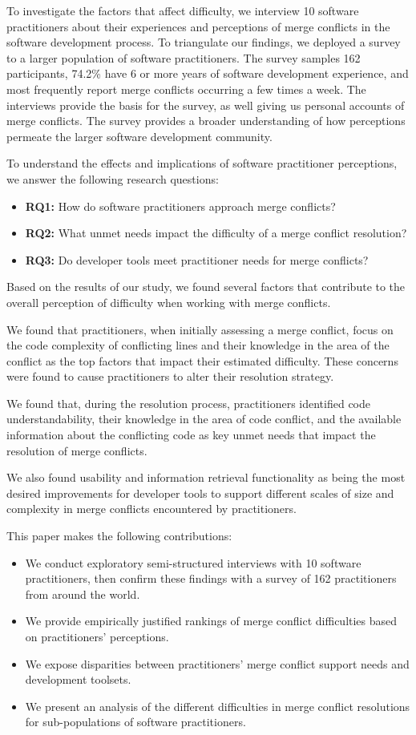 To investigate the factors that affect difficulty, we interview 10 software practitioners about their experiences and perceptions of merge conflicts in the software development process.
To triangulate our findings, we deployed a survey to a larger population of software practitioners.
The survey samples 162 participants, 74.2\% have 6 or more years of software development experience, and most frequently report merge conflicts occurring a few times a week.
The interviews provide the basis for the survey, as well giving us personal accounts of merge conflicts.
The survey provides a broader understanding of how perceptions permeate the larger software development community.

To understand the effects and implications of software practitioner perceptions, we answer the following research questions:

\begin{itemize}
\item \textbf{RQ1:} How do software practitioners approach merge conflicts?
\item \textbf{RQ2:} What unmet needs impact the difficulty of a merge conflict resolution?
\item \textbf{RQ3:} Do developer tools meet practitioner needs for merge conflicts?
\end{itemize}

Based on the results of our study, we found several factors that contribute to the overall perception of difficulty when working with merge conflicts.

We found that practitioners, when initially assessing a merge conflict, focus on the code complexity of conflicting lines and their knowledge in the area of the conflict as the top factors that impact their estimated difficulty.
These concerns were found to cause practitioners to alter their resolution strategy.

We found that, during the resolution process, practitioners identified code understandability, their knowledge in the area of code conflict, and the available information about the conflicting code as key unmet needs that impact the resolution of merge conflicts.

We also found usability and information retrieval functionality as being the most desired improvements for developer tools to support different scales of size and complexity in merge conflicts encountered by practitioners.

This paper makes the following contributions:
\begin{itemize}
\item We conduct exploratory semi-structured interviews with 10 software practitioners, then confirm these findings with a survey of 162 practitioners from around the world.
\item We provide empirically justified rankings of merge conflict difficulties based on practitioners' perceptions.
\item We expose disparities between practitioners' merge conflict support needs and development toolsets.
\item We present an analysis of the different difficulties in merge conflict resolutions for sub-populations of software practitioners.
\end{itemize}